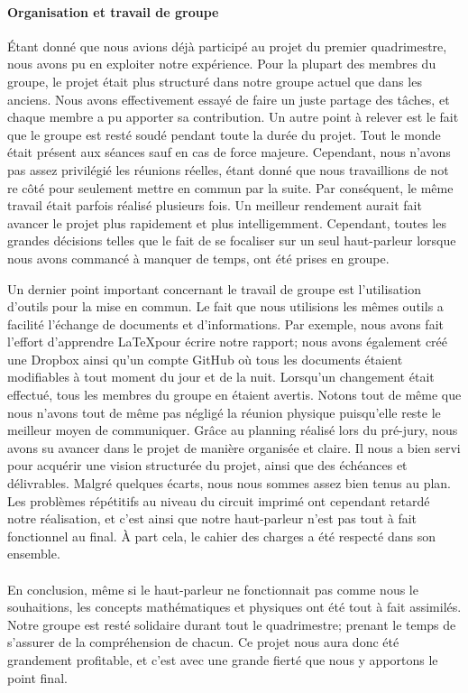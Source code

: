 \paragraph {Organisation et travail de groupe}
Étant donné que nous avions déjà participé au projet du premier quadrimestre, nous avons pu en exploiter 
notre expérience.  Pour la plupart des membres du groupe, le projet était plus structuré dans notre groupe
actuel que dans les anciens. Nous avons effectivement essayé de faire un juste partage des tâches, et chaque
membre a pu apporter sa contribution. Un autre point à relever est le fait que le groupe est resté soudé 
pendant toute la durée du projet. Tout le monde était présent aux séances sauf en cas de force majeure. 
Cependant, nous n'avons pas assez privilégié les réunions réelles, étant donné que nous travaillions de not
re côté pour seulement mettre en commun par la suite. Par conséquent, le même travail était parfois réalisé
plusieurs fois. Un meilleur rendement aurait fait avancer le projet plus rapidement et plus intelligemment.
Cependant, toutes les grandes décisions telles que le fait de se focaliser sur un seul haut-parleur lorsque 
nous avons commancé à manquer de temps, ont été prises en groupe.


Un dernier point important concernant le travail de groupe est l'utilisation d'outils pour la mise en commun.
Le fait que nous utilisions les mêmes outils a facilité l’échange de documents et d’informations. 
Par exemple, nous avons fait l’effort d’apprendre \LaTeX pour écrire notre rapport; nous avons également créé
une Dropbox ainsi qu’un compte GitHub où tous les documents étaient modifiables à tout moment du jour et de 
la nuit. Lorsqu'un changement était effectué, tous les membres du groupe en étaient avertis. 
Notons tout de même que nous n'avons tout de même pas négligé la réunion physique puisqu'elle reste 
le meilleur moyen de communiquer. 
Grâce au planning réalisé lors du pré-jury, nous avons su avancer dans le projet de manière organisée et 
claire. Il nous a bien servi pour acquérir une vision structurée du projet, ainsi que des échéances
et délivrables. Malgré quelques écarts, nous nous sommes assez bien tenus au plan. Les problèmes répétitifs 
au niveau du circuit imprimé ont cependant retardé notre réalisation, et c'est ainsi que notre haut-parleur 
n'est pas tout à fait fonctionnel au final. À part cela, le cahier des charges a été respecté dans son ensemble.


\paragraph{} 
En conclusion, même si le haut-parleur ne fonctionnait pas comme nous le souhaitions, les concepts 
mathématiques et physiques ont été tout à fait assimilés. Notre groupe est resté solidaire durant tout 
le quadrimestre; prenant le temps de s'assurer de la compréhension de chacun. Ce projet nous aura donc été
grandement profitable, et c'est avec une grande fierté que nous y apportons le point final.






